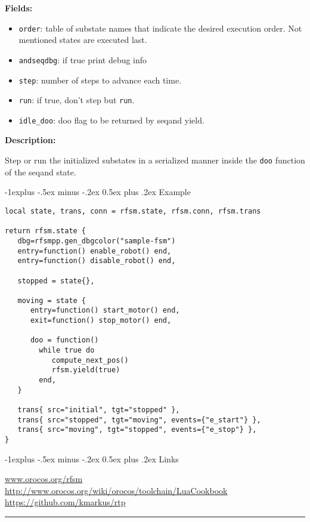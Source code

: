 \documentclass[10pt,landscape]{article}
\makeatletter
\renewcommand{\subsection}{\@startsection{subsection}{2}{0mm}%
                                {-1explus -.5ex minus -.2ex}%
                                {0.5ex plus .2ex}%
                                {\normalfont\small\bfseries}}
\makeatother
\begin{document}
\begin{multicols}{3}
\textbf{Fields:}\\
\begin{itemize}
\item \texttt{order}: table of substate names that indicate the
  desired execution order. Not mentioned states are executed last.
\item \texttt{andseqdbg}: if true print debug info
\item \texttt{step}: number of steps to advance each time.
\item \texttt{run}: if true, don't step but \texttt{run}.
\item \texttt{idle\_doo}: doo flag to be returned by seqand yield.
\end{itemize}

\textbf{Description:}

Step or run the initialized substates in a serialized manner inside
the \texttt{doo} function of the seqand state.

\subsection{Example}
\label{sec:example-1}

\begin{verbatim}
local state, trans, conn = rfsm.state, rfsm.conn, rfsm.trans

return rfsm.state {
   dbg=rfsmpp.gen_dbgcolor("sample-fsm")
   entry=function() enable_robot() end,
   entry=function() disable_robot() end,

   stopped = state{},

   moving = state {
      entry=function() start_motor() end,
      exit=function() stop_motor() end,

      doo = function()
        while true do
           compute_next_pos()
           rfsm.yield(true)
        end,
   }

   trans{ src="initial", tgt="stopped" },
   trans{ src="stopped", tgt="moving", events={"e_start"} },
   trans{ src="moving", tgt="stopped", events={"e_stop"} },
}
\end{verbatim}

\subsection{Links}
\label{sec:links}

\url{www.orocos.org/rfsm}
\url{http://www.orocos.org/wiki/orocos/toolchain/LuaCookbook}
\url{https://github.com/kmarkus/rtp}
\rule{0.3\linewidth}{0.25pt}
\scriptsize


\end{multicols}
\end{document}
